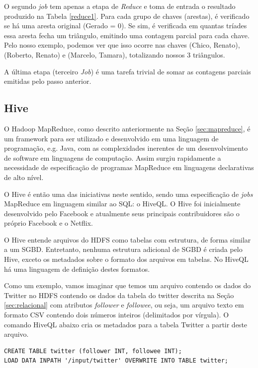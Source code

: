 O segundo \textit{job} tem apenas a etapa de \textit{Reduce} e toma de entrada o resultado produzido na 
Tabela \ref{reduce1}. Para cada grupo de chaves (arestas), é verificado se há uma aresta original 
(Gerado = 0). Se sim, é verificada em quantas tríades essa aresta fecha um triângulo, emitindo uma 
contagem parcial para cada chave. Pelo nosso exemplo, podemos ver que isso ocorre nas chaves 
(Chico, Renato), (Roberto, Renato) e (Marcelo, Tamara), totalizando nossos 3 triângulos.

A última etapa (terceiro \textit{Job}) é uma tarefa trivial de somar as contagens parciais emitidas 
pelo passo anterior.

\subsection{Hive}

O Hadoop MapReduce, como descrito anteriormente na Seção \ref{sec:mapreduce}, é um framework para ser 
utilizado e desenvolvido em uma linguagem de programação, e.g. Java, com as complexidades inerentes de 
um desenvolvimento de software em linguagens de computação. Assim surgiu rapidamente a necessidade de 
especificação de programas MapReduce em linguagens declarativas de alto nível.

O Hive \cite{thusoo2009hive} é então uma das iniciativas neste sentido, sendo uma especificação de 
\textit{jobs} MapReduce em linguagem similar ao SQL: o HiveQL. O Hive foi inicialmente desenvolvido 
pelo Facebook e atualmente seus principais contribuidores são o próprio Facebook e o Netflix.

O Hive entende arquivos do HDFS como tabelas com estrutura, de forma similar a um SGBD. Entretanto, 
nenhuma estrutura adicional de SGBD é criada pelo Hive, exceto os metadados sobre o formato dos arquivos 
em tabelas. No HiveQL há uma linguagem de definição destes formatos.

Como um exemplo, vamos imaginar que temos um arquivo contendo os dados do Twitter no HDFS contendo 
os dados da tabela do twitter descrita na Seção \ref{sec:relacional} com atributos \textit{follower} e
\textit{followee}, ou seja, um arquivo texto em formato CSV contendo dois números inteiros (delimitados
por vírgula). O comando HiveQL abaixo cria os metadados para a tabela Twitter a partir deste arquivo.

\begin{verbatim}
CREATE TABLE twitter (follower INT, followee INT);
LOAD DATA INPATH '/input/twitter' OVERWRITE INTO TABLE twitter;
\end{verbatim}

